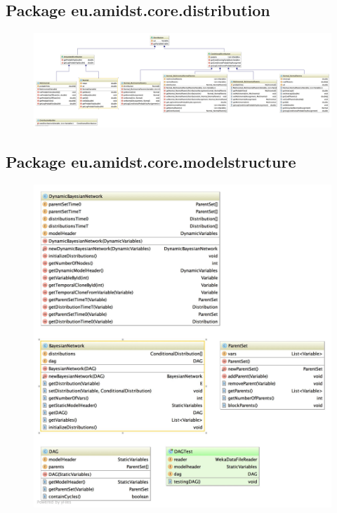 \subsection{Package eu.amidst.core.distribution}

\begin{figure}[H]
  \centering
    \includegraphics[width=\textwidth]{ClassDiagrams/core_distribution.jpg}
\end{figure}



\subsection{Package eu.amidst.core.modelstructure}
\begin{figure}[H]
  \centering
    \includegraphics[width=\textwidth]{ClassDiagrams/core_modelstructure.jpg}
\end{figure}

